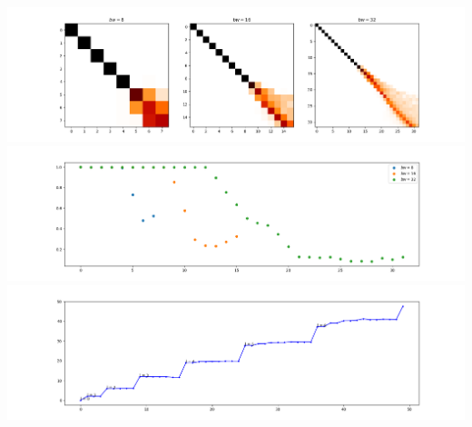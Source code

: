 \begin{minipage}[t!]{.49\textwidth}
	\raggedleft
	\center
	\centering
	\includegraphics[width=\textwidth]{../codes/03.FEM_laplacian/equiangular/mass_lumping/BL/img/linearFEM.png}
	\includegraphics[width=\textwidth]{../codes/03.FEM_laplacian/equiangular/mass_lumping/BL/img/linearFEM_diagonal.png}	
	\includegraphics[width=\textwidth]{../codes/03.FEM_laplacian/equiangular/mass_lumping/BL/img/FEM_eigenvalues_32.png}	
\end{minipage}
\hfill
%
